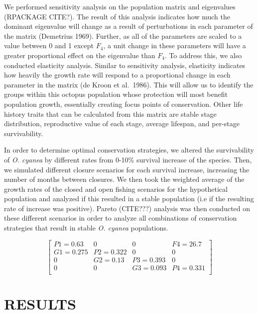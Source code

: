 \documentclass[
]{article}
\begin{document}
We performed sensitivity analysis on the population matrix and eigenvalues (RPACKAGE CITE?). The result of this analysis indicates how much the dominant eigenvalue will change as a result of perturbations in each parameter of the matrix (Demetrius 1969). Further, as all of the parameters are scaled to a value between 0 and 1 except \(F_4\), a unit change in these parameters will have a greater proportional effect on the eigenvalue than \(F_4\). To address this, we also conducted elasticity analysis. Similar to sensitivity analysis, elasticity indicates how heavily the growth rate will respond to a proportional change in each parameter in the matrix (de Kroon et al.~1986). This will allow us to identify the groups within this octopus population whose protection will most benefit population growth, essentially creating focus points of conservation. Other life history traits that can be calculated from this matrix are stable stage distribution, reproductive value of each stage, average lifespan, and per-stage survivability.

In order to determine optimal conservation strategies, we altered the survivability of \emph{O. cyanea} by different rates from 0-10\% survival increase of the species. Then, we simulated different closure scenarios for each survival increase, increasing the number of months between closures. We then took the weighted average of the growth rates of the closed and open fishing scenarios for the hypothetical population and analyzed if this resulted in a stable population (i.e if the resulting rate of increase was positive). Pareto (CITE???) analysis was then conducted on these different scenarios in order to analyze all combinations of conservation strategies that result in stable \emph{O. cyanea} populations.

\[\begin{bmatrix}
P1 = 0.63&0&0&F4 = 26.7 \\
G1 = 0.275&P2 = 0.322&0&0 \\
0&G2 = 0.13&P3 = 0.393&0 \\
0&0&G3 = 0.093&P4 = 0.331 \\
\end{bmatrix}\]

\hypertarget{results}{%
\section{RESULTS}\label{results}}
\end{document}
